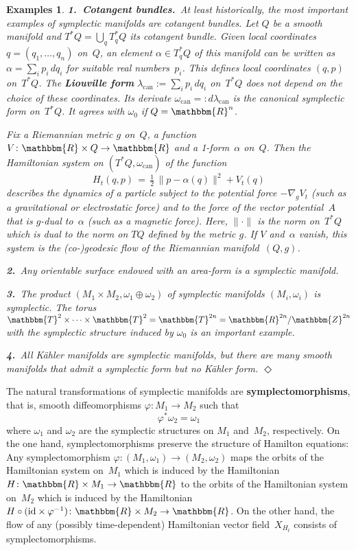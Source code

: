 \documentclass[12pt,twoside]{amsart}
\theoremstyle{plain}
\newtheorem*{examples*}{Examples}
\numberwithin{figure}{section}
\numberwithin{equation}{section}
\newcommand{\diam}{\hspace*{\fill} $\Diamond$}
\def\m{\medskip}
\def\can{\operatorname{can}}
\def\ga{\alpha}
\def\go{\omega}
\def\RR{\mathbbm{R}}
\def\TT{\mathbbm{T}}
\def\ZZ{\mathbbm{Z}}
\def\ni{\noindent}
\def\m{\medskip}
\begin{document}
\begin{examples*}
{\rm 
{\bf 1.\ Cotangent bundles.}\
At least historically, the most important examples of symplectic manifolds are cotangent bundles.
Let $Q$ be a smooth manifold and $T^*Q = \bigcup_q T_q^*Q$ its cotangent bundle. 
Given local coordinates $q = (q_1, \dots, q_n)$ on~$Q$,
an element $\ga \in T_q^*Q$ of this manifold can be written as $\ga = \sum_i p_i \,dq_i$ for suitable real numbers~$p_i$. 
This defines local coordinates $(q,p)$ on~$T^*Q$. 
The {\bf Liouville form} $\lambda_{\can} := \sum_i p_i \,dq_i$ on~$T^*Q$ does not depend on the choice of these coordinates.
Its derivate $\go_{\can} =: d \lambda_{\can}$ is the canonical symplectic form on~$T^*Q$. 
It agrees with $\go_0$ if $Q = \RR^n$.

Fix a Riemannian metric $g$ on~$Q$, a function $V \colon \RR \times Q \to \RR$
and a 1-form~$\ga$ on~$Q$. 
Then the Hamiltonian system on $(T^*Q,\go_{\can})$ of the function
\begin{equation}  \label{e:classical}
H_t(q,p) \,=\, \tfrac 12\, \| p-\ga (q) \|^2 + V_t(q)
\end{equation}
describes the dynamics of a particle subject to the potential force $-\nabla_g V_t$ (such as a gravitational or electrostatic force) and to the force of the vector potential~$A$ that is $g$-dual to~$\ga$ (such as a magnetic force).
Here, $\| \cdot\|$ is the norm on~$T^* Q$ which is dual to the norm on $TQ$ defined by the metric $g$.
If $V$ and~$\ga$ vanish, this system is the (co-)geodesic flow of the Riemannian manifold~$(Q,g)$.

\m \ni
{\bf 2.}\
Any orientable surface endowed with an area-form is a symplectic manifold.

\m \ni
{\bf 3.}\
The product $(M_1 \times M_2, \go_1 \oplus \go_2)$ of symplectic manifolds $(M_i,\go_i)$ is symplectic. 
The torus $\TT^2 \times \dots \times \TT^2 = \TT^{2n} = \RR^{2n}/\ZZ^{2n}$ with the symplectic structure induced by $\go_0$
is an important example.

\m \ni
{\bf 4.}\
All K\"ahler manifolds are symplectic manifolds, but there are many smooth manifolds
that admit a symplectic form but no K\"ahler form. 
\diam 
}
\end{examples*}

The natural transformations of symplectic manifolds are {\bf symplectomorphisms}, that is, smooth diffeomorphisms 
$\varphi \colon M_1 \rightarrow M_2$ such that
\[
\varphi^* \omega_2 = \omega_1
\]
where $\omega_1$ and $\omega_2$ are the symplectic structures on $M_1$ and~$M_2$, respectively. 
On the one hand, symplectomorphisms preserve the structure of Hamilton equations: 
Any symplectomorphism $\varphi \colon (M_1,\omega_1) \rightarrow (M_2,\omega_2)$ maps the orbits of the Hamiltonian system on~$M_1$ which is induced by the Hamiltonian $H \colon \RR \times M_1 \rightarrow \RR$ to the orbits of the Hamiltonian system on~$M_2$ which is induced by the Hamiltonian 
$H \circ (\mathrm{id} \times \varphi^{-1}) \colon \RR \times M_2 \rightarrow \RR$. 
On the other hand, the flow of any (possibly time-dependent) Hamiltonian vector field~$X_{H_t}$ 
consists of symplectomorphisms.
\end{document}
